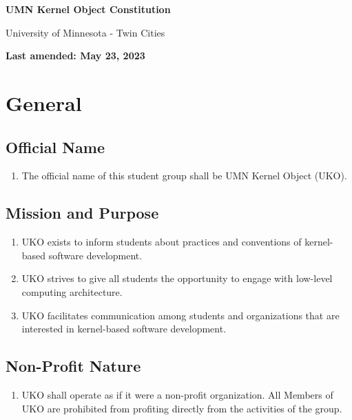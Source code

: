 \documentclass[12pt,executivepaper]{article}
\begin{document}
\begin{center}
    \Large
    \textbf{UMN Kernel Object Constitution}

    \smallskip

    \large
    University of Minnesota - Twin Cities

    \smallskip

    \normalsize
    \textbf{Last amended: May 23, 2023}
\end{center}

\section{General}

\subsection{Official Name}
\begin{enumerate}
    \item The official name of this student group shall be UMN Kernel Object
          (UKO).
\end{enumerate}

\subsection{Mission and Purpose}
\begin{enumerate}
    \item UKO exists to inform students about practices and conventions of
          kernel-based software development.
    \item UKO strives to give all students the opportunity to engage with
          low-level computing architecture.
    \item UKO facilitates communication among students and organizations that
          are interested in kernel-based software development.
\end{enumerate}

\subsection{Non-Profit Nature}
\begin{enumerate}
    \item UKO shall operate as if it were a non-profit organization. All
          Members of UKO are prohibited from profiting directly from the
          activities of the group.
\end{enumerate}
\end{document}
